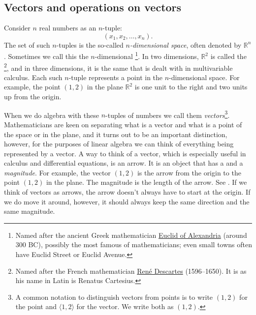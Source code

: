 \subsection{Vectors and operations on vectors}

Consider $n$ real numbers as an $n$-tuple:
\begin{equation*}
(x_1,x_2,\ldots,x_n). 
\end{equation*}
The set of such $n$-tuples is the so-called
\emph{$n$-dimensional space},
often denoted by ${\mathbb R}^n$.
Sometimes we call this the $n$-dimensional
\emph{}%
\footnote{Named after the ancient Greek mathematician
\href{https://en.wikipedia.org/wiki/Euclid}{Euclid of Alexandria}
(around 300 BC), possibly the most famous of mathematicians; even
small towns often have Euclid Street or Euclid Avenue.}. 
In two dimensions, ${\mathbb R}^2$ is called the
\emph{}%
\footnote{Named after the French mathematician
\href{https://en.wikipedia.org/wiki/Descartes}{Ren\'e Descartes}
(1596--1650).  It is  as his name in Latin is Renatus
Cartesius.}, and in three dimensions, it is the same  that is dealt with in multivariable calculus.
Each such $n$-tuple represents a point in the $n$-dimensional space.
For example, the point
$(1,2)$ in the plane ${\mathbb R}^2$
is one unit to the right and two units up from the
origin.

When we do algebra with these $n$-tuples of numbers we call them
\emph{vectors}\footnote{%
A common notation to distinguish vectors from points is to write $(1,2)$ 
for the point and $\langle 1,2 \rangle$ for the vector.  We write both as
$(1,2)$.}.  Mathematicians are keen on separating
what is a vector and what is a point of the space or in the plane,
and it turns out
to be an important distinction, however, for the purposes of linear algebra
we can think of everything being represented by a vector.
A way to think of a vector, which is especially useful in calculus
and differential equations, is an arrow.  It is an object that has
a \emph{} and a \emph{magnitude}.
For example, the vector $(1,2)$
is the arrow from the origin to the point $(1,2)$ in the plane.
The magnitude is the length of the arrow.
See .
If we think of vectors as arrows,
the arrow doesn't always have to start at the origin.  If we do move it
around, however, it should always keep the same direction and the same magnitude.

